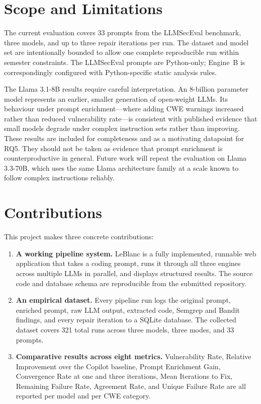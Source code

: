 \documentclass[12pt,a4paper]{report}
\begin{document}
\section{Scope and Limitations}
\label{sec:scope}

The current evaluation covers 33 prompts from the LLMSecEval benchmark, three
models, and up to three repair iterations per run. The dataset and model set are
intentionally bounded to allow one complete reproducible run within semester
constraints. The LLMSecEval prompts are Python-only; Engine~B is correspondingly
configured with Python-specific static analysis rules.

The Llama 3.1-8B results require careful interpretation. An 8-billion parameter
model represents an earlier, smaller generation of open-weight LLMs. Its behaviour
under prompt enrichment---where adding CWE warnings increased rather than reduced
vulnerability rate---is consistent with published evidence that small models
degrade under complex instruction sets rather than improving. These results are
included for completeness and as a motivating datapoint for RQ5. They should not
be taken as evidence that prompt enrichment is counterproductive in general.
Future work will repeat the evaluation on Llama 3.3-70B, which uses the same
Llama architecture family at a scale known to follow complex instructions reliably.

\section{Contributions}
\label{sec:contributions}

This project makes three concrete contributions:

\begin{enumerate}
  \item \textbf{A working pipeline system.} LeBlanc is a fully implemented,
        runnable web application that takes a coding prompt, runs it through all
        three engines across multiple LLMs in parallel, and displays structured
        results. The source code and database schema are reproducible from the
        submitted repository.

  \item \textbf{An empirical dataset.} Every pipeline run logs the original
        prompt, enriched prompt, raw LLM output, extracted code, Semgrep and
        Bandit findings, and every repair iteration to a SQLite database. The
        collected dataset covers 321 total runs across three models, three modes,
        and 33 prompts.

  \item \textbf{Comparative results across eight metrics.} Vulnerability Rate,
        Relative Improvement over the Copilot baseline, Prompt Enrichment Gain,
        Convergence Rate at one and three iterations, Mean Iterations to Fix,
        Remaining Failure Rate, Agreement Rate, and Unique Failure Rate are all
        reported per model and per CWE category.
\end{enumerate}
\end{document}
